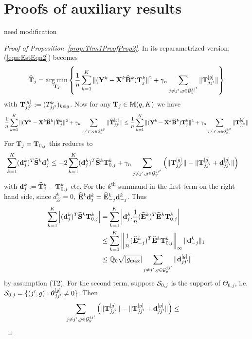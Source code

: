 \section{Proofs of auxiliary results}
{\colrbf need modification}
\begin{proof}[Proof of Proposition~\ref{prop:Thm1ProofProp2}]
In its reparametrized version, (\ref{eqn:EstEqn2}) becomes
%
\begin{align}
\widehat {{\mathbf{T}}}_j = \operatorname*{arg\,min}_{{\mathbf{T}}_j} \left\{ \frac{1}{n} \sum_{k=1}^K \| ({\mathbf{Y}}^k - {\mathbf{X}}^k \widehat {{\mathbf{B}}}^k) {\mathbf{T}}_j^k \|^2 + \gamma_n \sum_{j \neq j', g \in {\cal{G}}_y^{jj'}} \| {\mathbf{T}}_{jj'}^{[g]} \| \right\}
\end{align}
%
with ${\mathbf{T}}_{jj'}^{[g]} := (T_{jj'}^k)_{k \in g}$. Now for any ${\mathbf{T}}_j \in {\mathbb{M}}(q, K)$ we have
%
$$
\frac{1}{n} \sum_{k=1}^K \| ({\mathbf{Y}}^k - {\mathbf{X}}^k \widehat {{\mathbf{B}}}^k) \widehat {{\mathbf{T}}}_j^k \|^2 + \gamma_n \sum_{j \neq j', g \in {\cal{G}}_y^{jj'}} \| \widehat {{\mathbf{T}}}_{jj'}^{[g]} \| \leq
\frac{1}{n} \sum_{k=1}^K \| ({\mathbf{Y}}^k - {\mathbf{X}}^k \widehat {{\mathbf{B}}}^k) {\mathbf{T}}_j^k \|^2 + \gamma_n \sum_{j \neq j', g \in {\cal{G}}_y^{jj'}} \| {\mathbf{T}}_{jj'}^{[g]} \|
$$
%
For ${\mathbf{T}}_j = {\mathbf{T}}_{0,j}$ this reduces to
%
\begin{align}\label{eqn::Thm1ProofProp2Eqn1}
\sum_{k=1}^K ({\bf{d}}_j^k)^T \widehat {{\mathbf{S}}}^k {\bf{d}}_j^k & \leq - 2 \sum_{k=1}^K ({\bf{d}}_j^k)^T \widehat {{\mathbf{S}}}^k {\mathbf{T}}_{0,j}^k + \gamma_n \sum_{j \neq j', g \in {\cal{G}}_y^{jj'}} \left( \| {\mathbf{T}}_{jj'}^{[g]} \| -  \| {\mathbf{T}}_{jj'}^{[g]} + {\bf{d}}_{jj'}^{[g]}\| \right)
\end{align}
%
with ${\bf{d}}_{j}^k := \widehat {{\mathbf{T}}}_j^k - {\mathbf{T}}_{0,j}^k$ etc. For the $k^\text{th}$ summand in the first term on the right hand side, since $d_{jj}^k = 0$, $\widehat {{\mathbf{E}}}^k {\bf{d}}_j^k = \widehat {{\mathbf{E}}}_{-j}^k {\bf{d}}_{-j}^k$. Thus
%
\begin{align*}
\sum_{k=1}^K \left| ({\bf{d}}_j^k)^T \widehat {{\mathbf{S}}}^k {\mathbf{T}}_{0,j}^k \right| &=
\sum_{k=1}^K \left| {\bf{d}}_j^k. \frac{1}{n} (\widehat {{\mathbf{E}}}^k)^T \widehat {{\mathbf{E}}}^k {\mathbf{T}}_{0,j}^k \right| \\
& \leq \sum_{k=1}^K \left\| \frac{1}{n} (\widehat {{\mathbf{E}}}_{-j}^k)^T \widehat {{\mathbf{E}}}^k {\mathbf{T}}_{0,j}^k \right\|_\infty \| {\bf{d}}_{-j}^k \|_1 \\
& \leq {\mathbb{Q}}_0 \sqrt {| g_{\max}|} \sum_{j \neq j', g \in {\cal{G}}_y^{jj'}} \| {\bf{d}}_{jj'}^{[g]} \|
\end{align*}
%
by assumption (T2). For the second term, suppose ${\cal{S}}_{0,j}$ is the support of $\Theta_{0,j}$, i.e. ${\cal{S}}_{0,j} = \{ (j',g): {\boldsymbol{\theta}}_{jj'}^{[g]} \neq 0 \}$. Then
%
\begin{align*}
\sum_{j \neq j', g \in \cG_y^{jj'}} \left( \| \bfT_{jj'}^{[g]} \| -  \| \bfT_{jj'}^{[g]} + \bfd_{jj'}^{[g]}\| \right) & \leq

\end{align*}
\end{proof}
